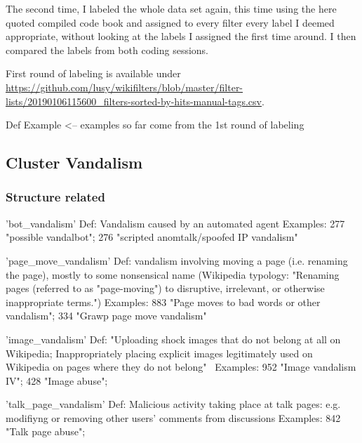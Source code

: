 The second time, I labeled the whole data set again, this time using the here quoted compiled code book and assigned to every filter every label I deemed appropriate, without looking at the labels I assigned the first time around.
I then compared the labels from both coding sessions. %

First round of labeling is available under \url{https://github.com/lusy/wikifilters/blob/master/filter-lists/20190106115600_filters-sorted-by-hits-manual-tags.csv}.


Def
Example <-- examples so far come from the 1st round of labeling


\subsection{Cluster Vandalism}

\subsubsection{Structure related}

'bot\_vandalism'
  Def: Vandalism caused by an automated agent
  Examples: 277 "possible vandalbot"; 276 "scripted anomtalk/spoofed IP vandalism"

'page\_move\_vandalism'
  Def: vandalism involving moving a page (i.e. renaming the page), mostly to some nonsensical name
  (Wikipedia typology: "Renaming pages (referred to as "page-moving") to disruptive, irrelevant, or otherwise inappropriate terms.")
  Examples: 883 "Page moves to bad words or other vandalism"; 334 "Grawp page move vandalism"

'image\_vandalism'
  Def: "Uploading shock images that do not belong at all on Wikipedia; Inappropriately placing explicit images legitimately used on Wikipedia on pages where they do not belong"~\cite{Wikipedia:VandalismTypes}
  Examples: 952 "Image vandalism IV"; 428 "Image abuse";

'talk\_page\_vandalism'
  Def: Malicious activity taking place at talk pages: e.g. modifiyng or removing other users' comments from discussions
  Examples: 842 "Talk page abuse";

